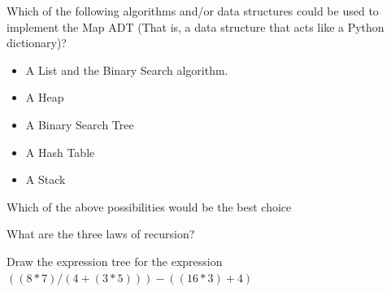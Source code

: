 \documentclass[11pt]{exam}
\begin{document}
\begin{questions}

\question[5] Which of the following algorithms and/or data structures could be used to implement the Map ADT (That is, a data structure that acts like a Python dictionary)?
\begin{itemize}
\item A List and the Binary Search algorithm.
\item A Heap
\item A Binary Search Tree
\item A Hash Table
\item A Stack
\end{itemize}

\question[2] Which of the above possibilities would be the best choice
\vspace{1in}

\question[3] What are the three laws of recursion?
\vspace{1in}

\question[10] Draw the expression tree for the expression $((8 * 7) / (4 + (3 * 5))) - ((16 * 3) + 4)$  

\newpage



\end{questions}
\end{document}
